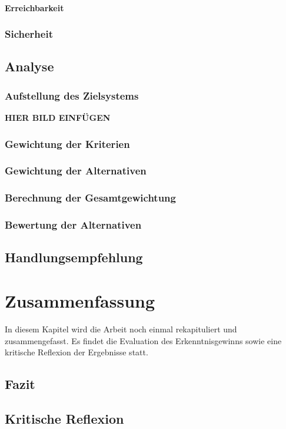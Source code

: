 \subsubsection{Erreichbarkeit}
\subsection{Sicherheit}
\section{Analyse}
\subsection{Aufstellung des Zielsystems}
\begin{center}\textbf{HIER BILD EINFÜGEN}\end{center}
\subsection{Gewichtung der Kriterien}
\subsection{Gewichtung der Alternativen}
\subsection{Berechnung der Gesamtgewichtung}
\subsection{Bewertung der Alternativen}
\section{Handlungsempfehlung}
\chapter{Zusammenfassung}
In diesem Kapitel wird die Arbeit noch einmal rekapituliert und zusammengefasst.
Es findet die Evaluation des Erkenntnisgewinns sowie eine kritische Reflexion der
Ergebnisse statt.
\section{Fazit} 
\section{Kritische Reflexion}
